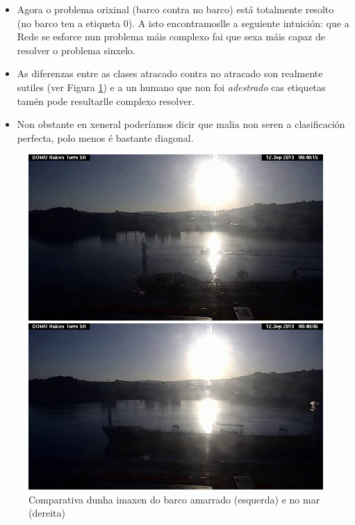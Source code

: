 \documentclass{article}
\begin{document}
\begin{itemize}
	\item Agora o problema orixinal (barco contra no barco) está totalmente resolto (no barco ten a etiqueta 0). A isto encontramoslle a seguiente intuición: que a Rede se esforce nun problema máis complexo fai que sexa máis capaz de resolver o problema sinxelo.
	\item As diferenzas entre as clases atracado contra no atracado son realmente sutiles (ver Figura \ref{fig:comparativaDoked}) e a un humano que non foi \emph{adestrado} cas etiquetas tamén pode resultarlle complexo resolver. 
	\item Non obstante en xeneral poderíamos dicir que malia non seren a clasificación perfecta, polo  menos é bastante diagonal.
\end{itemize}


\begin{figure}[h]
	\centering
	\begin{minipage}{0.45\textwidth}
		\centering
		\includegraphics[width=\linewidth]{docked.jpg}
	\end{minipage}
	\hfill
	\begin{minipage}{0.45\textwidth}
		\centering
		\includegraphics[width=\linewidth]{undocked.jpg}
	\end{minipage}
	\label{fig:comparativaDoked}
	\caption{Comparativa dunha imaxen do barco amarrado (esquerda) e no mar (dereita)}
\end{figure}
\end{document}
